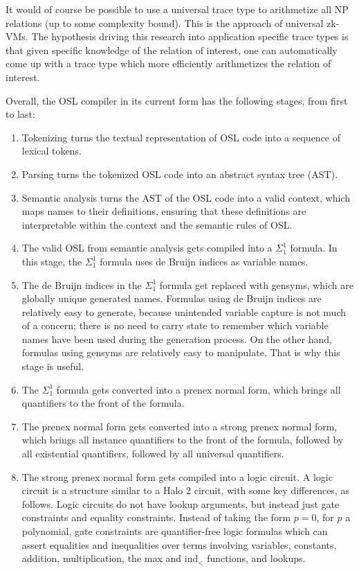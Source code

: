 \documentclass[11pt]{article}
\begin{document}
It would of course be possible to use a universal trace type to arithmetize all NP relations (up to some complexity bound). This is the approach of universal zk-VMs. The hypothesis driving this research into application specific trace types is that given specific knowledge of the relation of interest, one can automatically come up with a trace type which more efficiently arithmetizes the relation of interest.

Overall, the OSL compiler in its current form has the following stages, from first to last:

\begin{enumerate}
	\item Tokenizing turns the textual representation of OSL code into a sequence of lexical tokens.
	\item Parsing turns the tokenized OSL code into an abstract syntax tree (AST).
	\item Semantic analysis turns the AST of the OSL code into a valid context, which maps names to their definitions, ensuring that these definitions are interpretable within the context and the semantic rules of OSL.
	\item The valid OSL from semantic analysis gets compiled into a $\Sigma^1_1$ formula. In this stage, the $\Sigma^1_1$ formula uses de Bruijn indices as variable names.
	\item The de Bruijn indices in the $\Sigma^1_1$ formula get replaced with gensyms, which are globally unique generated names. Formulas using de Bruijn indices are relatively easy to generate, because unintended variable capture is not much of a concern; there is no need to carry state to remember which variable names have been used during the generation process. On the other hand, formulas using gensyms are relatively easy to manipulate. That is why this stage is useful.
	\item The $\Sigma^1_1$ formula gets converted into a prenex normal form, which brings all quantifiers to the front of the formula.
	\item The prenex normal form gets converted into a strong prenex normal form, which brings all instance quantifiers to the front of the formula, followed by all existential quantifiers, followed by all universal quantifiers.
	\item The strong prenex normal form gets compiled into a logic circuit. A logic circuit is a structure similar to a Halo 2 \cite{halo2-book,halo2-github} circuit, with some key differences, as follows. Logic circuits do not have lookup arguments, but instead just gate constraints and equality constraints. Instead of taking the form $p = 0$, for $p$ a polynomial, gate constraints are quantifier-free logic formulas which can assert equalities and inequalities over terms involving variables, constants, addition, multiplication, the max and $\text{ind}_<$ functions, and lookups.


\end{enumerate}
\end{document}
